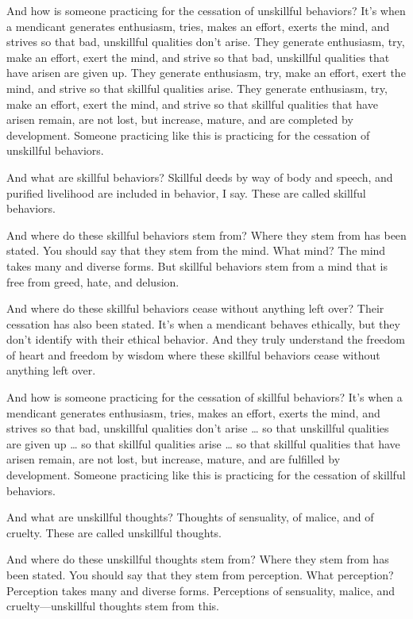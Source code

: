 \documentclass[12pt,openany]{book}%
\begin{document}
And how is someone practicing for the cessation of unskillful behaviors? It’s when a mendicant generates enthusiasm, tries, makes an effort, exerts the mind, and strives so that bad, unskillful qualities don’t arise. They generate enthusiasm, try, make an effort, exert the mind, and strive so that bad, unskillful qualities that have arisen are given up. They generate enthusiasm, try, make an effort, exert the mind, and strive so that skillful qualities arise. They generate enthusiasm, try, make an effort, exert the mind, and strive so that skillful qualities that have arisen remain, are not lost, but increase, mature, and are completed by development. Someone practicing like this is practicing for the cessation of unskillful behaviors. 

And what are skillful behaviors? Skillful deeds by way of body and speech, and purified livelihood are included in behavior, I say. These are called skillful behaviors. 

And where do these skillful behaviors stem from? Where they stem from has been stated. You should say that they stem from the mind. What mind? The mind takes many and diverse forms. But skillful behaviors stem from a mind that is free from greed, hate, and delusion. 

And where do these skillful behaviors cease without anything left over? Their cessation has also been stated. It’s when a mendicant behaves ethically, but they don’t identify with their ethical behavior. And they truly understand the freedom of heart and freedom by wisdom where these skillful behaviors cease without anything left over. 

And how is someone practicing for the cessation of skillful behaviors? It’s when a mendicant generates enthusiasm, tries, makes an effort, exerts the mind, and strives so that bad, unskillful qualities don’t arise … so that unskillful qualities are given up … so that skillful qualities arise … so that skillful qualities that have arisen remain, are not lost, but increase, mature, and are fulfilled by development. Someone practicing like this is practicing for the cessation of skillful behaviors. 

And what are unskillful thoughts? Thoughts of sensuality, of malice, and of cruelty. These are called unskillful thoughts. 

And where do these unskillful thoughts stem from? Where they stem from has been stated. You should say that they stem from perception. What perception? Perception takes many and diverse forms. Perceptions of sensuality, malice, and cruelty—unskillful thoughts stem from this. 
\end{document}

